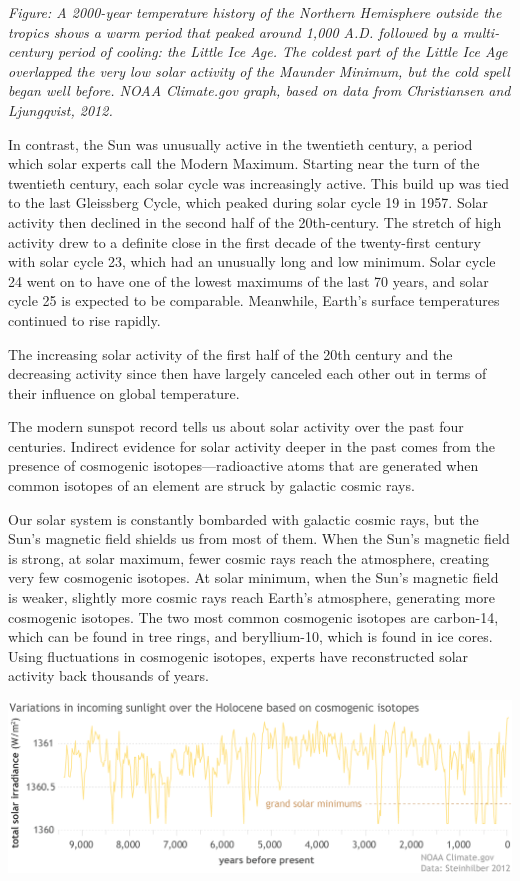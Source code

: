 \documentclass[
]{book}
\begin{document}
\emph{Figure: A 2000-year temperature history of the Northern Hemisphere outside the tropics shows a warm period that peaked around 1,000 A.D. followed by a multi-century period of cooling: the Little Ice Age. The coldest part of the Little Ice Age overlapped the very low solar activity of the Maunder Minimum, but the cold spell began well before. NOAA Climate.gov graph, based on data from Christiansen and Ljungqvist, 2012.}

In contrast, the Sun was unusually active in the twentieth century, a period which solar experts call the Modern Maximum. Starting near the turn of the twentieth century, each solar cycle was increasingly active. This build up was tied to the last Gleissberg Cycle, which peaked during solar cycle 19 in 1957. Solar activity then declined in the second half of the 20th-century. The stretch of high activity drew to a definite close in the first decade of the twenty-first century with solar cycle 23, which had an unusually long and low minimum. Solar cycle 24 went on to have one of the lowest maximums of the last 70 years, and solar cycle 25 is expected to be comparable. Meanwhile, Earth's surface temperatures continued to rise rapidly.

The increasing solar activity of the first half of the 20th century and the decreasing activity since then have largely canceled each other out in terms of their influence on global temperature.

The modern sunspot record tells us about solar activity over the past four centuries. Indirect evidence for solar activity deeper in the past comes from the presence of cosmogenic isotopes---radioactive atoms that are generated when common isotopes of an element are struck by galactic cosmic rays.

Our solar system is constantly bombarded with galactic cosmic rays, but the Sun's magnetic field shields us from most of them. When the Sun's magnetic field is strong, at solar maximum, fewer cosmic rays reach the atmosphere, creating very few cosmogenic isotopes. At solar minimum, when the Sun's magnetic field is weaker, slightly more cosmic rays reach Earth's atmosphere, generating more cosmogenic isotopes. The two most common cosmogenic isotopes are carbon-14, which can be found in tree rings, and beryllium-10, which is found in ice cores. Using fluctuations in cosmogenic isotopes, experts have reconstructed solar activity back thousands of years.

\includegraphics{fig/TSI_cosmogenic_holocene_1400.png}
\end{document}

